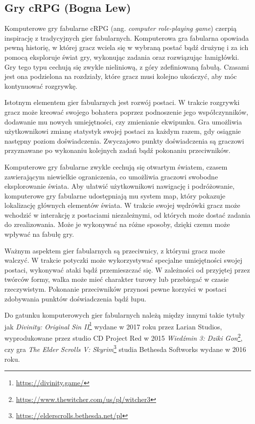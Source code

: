 \subsection{Gry cRPG (Bogna Lew)}\label{ss:rpg}
Komputerowe gry fabularne cRPG (ang. \textit{computer role-playing game}) czerpią inspirację z tradycyjnych gier fabularnych. Komputerowa
gra fabularna opowiada pewną historię, w której gracz wciela się w wybraną postać bądź drużynę i
za ich pomocą eksploruje świat gry, wykonując zadania oraz rozwiązując łamigłówki. Gry tego typu cechują się zwykle
nieliniową, z góry zdefiniowaną fabułą. Czasami jest ona podzielona na rozdziały, które gracz musi kolejno ukończyć, aby
móc kontynuować rozgrywkę.

Istotnym elementem gier fabularnych jest rozwój postaci. W trakcie rozgrywki gracz może kreować swojego bohatera
poprzez podnoszenie jego współczynników, dodawanie mu nowych umiejętności, czy zmienianie ekwipunku. Gra umożliwia
użytkownikowi zmianę statystyk swojej postaci za każdym razem, gdy osiągnie następny poziom doświadczenia. Zwyczajowo
punkty doświadczenia są graczowi przyznawane po wykonaniu kolejnych zadań bądź pokonaniu przeciwników.

Komputerowe gry fabularne zwykle cechują się otwartym światem, czasem zawierającym niewielkie ograniczenia, co umożliwia
graczowi swobodne eksplorowanie świata. Aby ułatwić użytkownikowi nawigację i podróżowanie, komputerowe gry fabularne
udostępniają mu system map, który pokazuje lokalizację głównych elementów świata. W trakcie swojej wędrówki gracz może
wchodzić w interakcję z postaciami niezależnymi, od których może dostać zadania do zrealizowania. Może je wykonywać na
różne sposoby, dzięki czemu może wpływać na fabułę gry.

Ważnym aspektem gier fabularnych są przeciwnicy, z którymi gracz może walczyć. W trakcie potyczki może wykorzystywać
specjalne umiejętności swojej postaci, wykonywać ataki bądź przemieszczać się. W zależności od przyjętej przez twórców
formy, walka może mieć charakter turowy lub przebiegać w czasie rzeczywistym. Pokonanie przeciwników przynosi pewne
korzyści w postaci zdobywania punktów doświadczenia bądź łupu.

Do gatunku komputerowych gier fabularnych należą między innymi takie tytuły jak \textit{Divinity: Original Sin II}\footnote{\url{https://divinity.game/}} wydane w 2017
roku przez Larian Studios, wyprodukowane przez studio CD Project Red w 2015 \textit{Wiedźmin 3: Dziki Gon}\footnote{\url{https://www.thewitcher.com/us/pl/witcher3}}, czy gra \textit{The Elder
Scrolls V: Skyrim}\footnote{\url{https://elderscrolls.bethesda.net/pl}} studia Bethesda Softworks wydane w 2016 roku.
